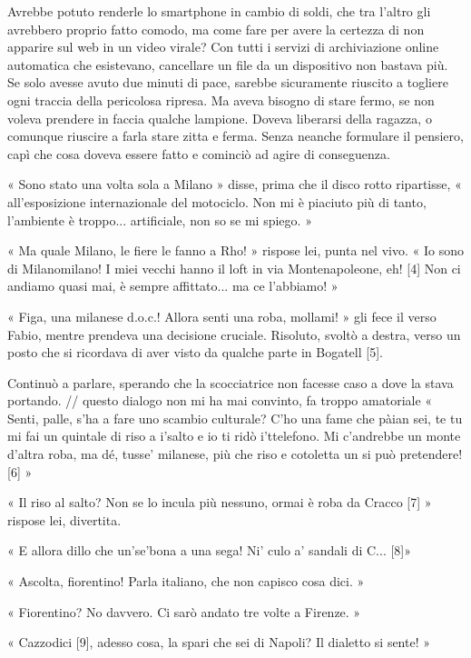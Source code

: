 Avrebbe potuto renderle lo smartphone in cambio di soldi, che tra l'altro gli avrebbero proprio fatto comodo, ma come fare per avere la certezza di non apparire sul web in un video virale? Con tutti i servizi di archiviazione online automatica che esistevano, cancellare un file da un dispositivo non bastava più. Se solo avesse avuto due minuti di pace, sarebbe sicuramente riuscito a togliere ogni traccia della pericolosa ripresa. Ma aveva bisogno di stare fermo, se non voleva prendere in faccia qualche lampione. Doveva liberarsi della ragazza, o comunque riuscire a farla stare zitta e ferma. Senza neanche formulare il pensiero, capì che cosa doveva essere fatto e cominciò ad agire di conseguenza.

« Sono stato una volta sola a Milano » disse, prima che il disco rotto ripartisse, « all'esposizione internazionale del motociclo. Non mi è piaciuto più di tanto, l'ambiente è troppo... artificiale, non so se mi spiego. »

« Ma quale Milano, le fiere le fanno a Rho! » rispose lei, punta nel vivo. « Io sono di Milanomilano! I miei vecchi hanno il loft in via Montenapoleone, eh! [4] Non ci andiamo quasi mai, è sempre affittato... ma ce l'abbiamo! »

« Figa, una milanese d.o.c.! Allora senti una roba, mollami! » gli fece il verso Fabio, mentre prendeva una decisione cruciale. Risoluto, svoltò a destra, verso un posto che si ricordava di aver visto da qualche parte in Bogatell [5].

Continuò a parlare, sperando che la scocciatrice non facesse caso a dove la stava portando.
// questo dialogo non mi ha mai convinto, fa troppo amatoriale
« Senti, palle, s'ha a fare uno scambio culturale? C'ho una fame che pàian sei, te tu mi fai un quintale di riso a i'salto e io ti ridò i'ttelefono. Mi c'andrebbe un monte d'altra roba, ma dé, tusse' milanese, più che riso e cotoletta un si può pretendere! [6] »

« Il riso al salto? Non se lo incula più nessuno, ormai è roba da Cracco [7] » rispose lei, divertita.

« E allora dillo che un'se'bona a una sega! Ni' culo a' sandali di C... [8]»

« Ascolta, fiorentino! Parla italiano, che non capisco cosa dici. »

« Fiorentino? No davvero. Ci sarò andato tre volte a Firenze. »

« Cazzodici [9], adesso cosa, la spari che sei di Napoli? Il dialetto si sente! »

